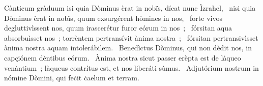 { Cànticum gràduum}
{%
isi quia Dòminus èrat in nobïs, dícat nunc Ìzrahel, 
~nisi quia Dòminus èrat in nobïs, quum exsurgérent hòmines in nos, 
~forte vivos degluttivìssent nos, quum irascerétur furor eórum in nos~; 
~fórsitan aqua absorbuìsset nos~; torrèntem pertransívit ànima nostra~; 
~fórsitan pertransivìsset ànima nostra aquam intolerábilem. 
~Benedìctus Dòminus, qui non dèdit nos, in capçiónem dèntibus eórum. 
~Ànima nostra sicut passer erèpta est de làqueo venàntium~; làqueus contrítus est, et nos liberáti sùmus. 
~Adjutórium nostrum in nómine Dòmini, qui feċit ċaelum et terram. 
}

